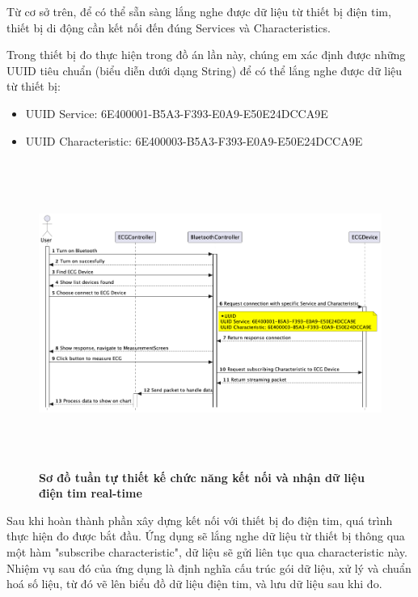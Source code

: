 Từ cơ sở trên, để có thể sẵn sàng lắng nghe được dữ liệu từ thiết bị điện tim, thiết bị di động cần kết nối đến đúng Services và Characteristics.

Trong thiết bị đo thực hiện trong đồ án lần này, chúng em xác định được những UUID tiêu chuẩn (biểu diễn dưới dạng String) để có thể lắng nghe được dữ liệu từ
thiết bị:
\begin{itemize}
  \item UUID Service: 6E400001-B5A3-F393-E0A9-E50E24DCCA9E
  \item UUID Characteristic: 6E400003-B5A3-F393-E0A9-E50E24DCCA9E
\end{itemize}

\begin{figure}[H]
  \centering
  \includegraphics[width=16cm,height=10cm]{Images/mobile_app/design_connect_and_receive_ECG_data.png}
  \caption[Sơ đồ tuần tự thiết kế chức năng kết nối và nhận dữ liệu điện tim real-time]{\bfseries \fontsize{12pt}{0pt}
  \selectfont Sơ đồ tuần tự thiết kế chức năng kết nối và nhận dữ liệu điện tim real-time}
  \label{seq_auth} %
\end{figure}

Sau khi hoàn thành phần xây dựng kết nối với thiết bị đo điện tim, quá trình thực hiện đo được bắt đầu. Ứng dụng sẽ lắng nghe
dữ liệu từ thiết bị thông qua một hàm "subscribe characteristic", dữ liệu sẽ gửi liên tục qua characteristic này. Nhiệm vụ sau đó của ứng dụng là
định nghĩa cấu trúc gói dữ liệu, xử lý và chuẩn hoá số liệu, từ đó vẽ lên biểu đồ dữ liệu điện tim, và lưu dữ liệu sau khi đo.

